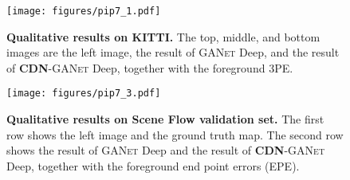 \documentclass{article}
\newcommand{\method}[1]{\textsc{#1}}
\newcommand{\GANet}{\method{GANet}\xspace}
\newcommand{\CDN}{\textbf{\method{CDN}}\xspace}
\begin{document}
\begin{figure}
\centering
\texttt{[image: figures/pip7\_1.pdf]}
\caption{\small \textbf{Qualitative results on KITTI.} The top, middle, and bottom images are the left image, the result of \GANet Deep, and the result of \CDN-\GANet Deep, together with the foreground 3PE.}
\label{fig:depth2}
\end{figure}

\begin{figure}
\centering
\texttt{[image: figures/pip7\_3.pdf]}
\caption{\small \textbf{Qualitative results on Scene Flow validation set.} The first row shows the left image and the ground truth map. The second row shows the result of \GANet Deep and the result of \CDN-\GANet Deep, together with the foreground end point errors (EPE).}
\label{fig:depth3}
\end{figure}






 
\end{document}
